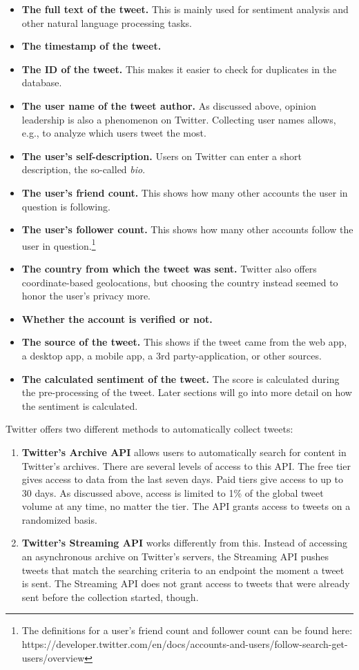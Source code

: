 \begin{itemize}
\item \textbf{The full text of the tweet.} This is mainly used for sentiment analysis and other natural language processing tasks.
\item \textbf{The timestamp of the tweet.}
\item \textbf{The ID of the tweet.} This makes it easier to check for duplicates in the database. 
\item \textbf{The user name of the tweet author.} As discussed above, opinion leadership is also a phenomenon on Twitter. Collecting user names allows, e.g., to analyze which users tweet the most.
\item \textbf{The user's self-description.} Users on Twitter can enter a short description, the so-called \emph{bio}.
\item \textbf{The user's friend count.} This shows how many other accounts the user in question is following.
\item \textbf{The user's follower count.} This shows how many other accounts follow the user in question.\footnote{The definitions for a user's friend count and follower count can be found here: https://developer.twitter.com/en/docs/accounts-and-users/follow-search-get-users/overview}
\item \textbf{The country from which the tweet was sent.} Twitter also offers coordinate-based geolocations, but choosing the country instead seemed to honor the user's privacy more.
\item \textbf{Whether the account is verified or not.}
\item \textbf{The source of the tweet.} This shows if the tweet came from the web app, a desktop app, a mobile app, a 3rd party-application, or other sources.
\item \textbf{The calculated sentiment of the tweet.} The score is calculated during the pre-processing of the tweet. Later sections will go into more detail on how the sentiment is calculated.
\end{itemize}


Twitter offers two different methods to automatically collect tweets:
\begin{enumerate}
    \item \textbf{Twitter's Archive API} allows users to automatically search for content in Twitter's archives. There are several levels of access to this API. The free tier gives access to data from the last seven days. Paid tiers give access to up to 30 days. As discussed above, access is limited to 1\% of the global tweet volume at any time, no matter the tier. The API grants access to tweets on a randomized basis.
    \item \textbf{Twitter's Streaming API} works differently from this. Instead of accessing an asynchronous archive on Twitter's servers, the Streaming API pushes tweets that match the searching criteria to an endpoint the moment a tweet is sent. The Streaming API does not grant access to tweets that were already sent before the collection started, though.
\end{enumerate}


